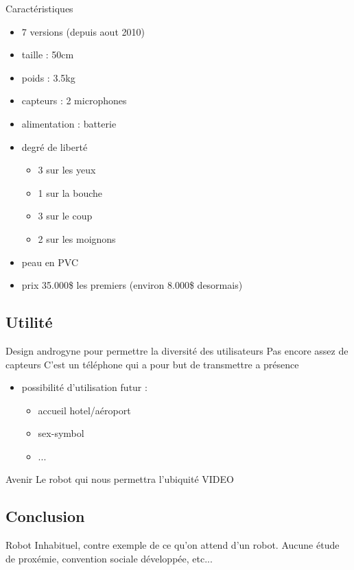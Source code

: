 \documentclass{beamer}
\begin{document}
\begin{frame}{Caractéristiques}
  \begin{itemize}
  \item 7 versions (depuis aout 2010)
  \item taille : 50cm
  \item poids : 3.5kg
  \item capteurs : 2 microphones
  \item alimentation : batterie
  \item degré de liberté
	\begin{itemize}
	\item 3 sur les yeux
	\item 1 sur la bouche
	\item 3 sur le coup
	\item 2 sur les moignons
	\end{itemize}
  \item peau en PVC
  \item prix 35.000\$ les premiers (environ 8.000\$ desormais)
  \end{itemize}
\end{frame}

\subsection{Utilité}
\begin{frame}
Design androgyne pour permettre la diversité des utilisateurs
\vspace{0.5cm}
Pas encore assez de capteurs
\vspace{0.5cm}
C'est un téléphone qui a pour but de transmettre a présence

  \begin{itemize}
  \item possibilité d'utilisation futur :
	  \begin{itemize}
	  \item accueil hotel/aéroport
	  \item sex-symbol
	  \item ...
	  \end{itemize}
  \end{itemize}
\end{frame}

\begin{frame}{Avenir}
  Le robot qui nous permettra l'ubiquité
\vspace{0.5cm}  
VIDEO
\end{frame}

\subsection{Conclusion}
\begin{frame}
  Robot Inhabituel, contre exemple de ce qu'on attend d'un robot.
  Aucune étude de proxémie, convention sociale développée, etc...
\end{frame}
\end{document}

